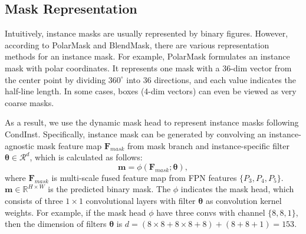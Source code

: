 \documentclass{article}
\begin{document}
\subsection{Mask Representation}

Intuitively, instance masks are usually represented by binary figures. However, according to PolarMask\cite{PolarMask} and BlendMask\cite{BlendMask}, there are various representation methods for an instance mask. For example, PolarMask formulates an instance mask with polar coordinates. It represents one mask with a 36-dim vector from the center point by dividing $360^{\circ}$ into 36 directions, and each value indicates the half-line length. In some cases, boxes (4-dim vectors) can even be viewed as very coarse masks. 

As a result, we use the dynamic mask head to represent instance masks following CondInst\cite{CondInst}. Specifically, instance mask can be generated by convolving an instance-agnostic mask feature map $\mathbf{{F}}_{mask}$ from mask branch and instance-specific filter $\bm{\theta} \in  \mathcal{R}^{d}$, which is calculated as follows:
\begin{equation}\label{maskhead}
    \mathbf{m} = \mathcal{\phi}(\mathbf{{F}}_{mask};\bm{\theta}),
\end{equation}
where $\mathbf{{F}}_{mask}$ is multi-scale fused feature map from FPN features $\{P_3, P_4, P_5\}$. $\mathbf{m} \in \mathbb{R}^{H\times W}$ is the predicted binary mask. The $\mathcal{\phi}$ indicates the mask head, which consists of three $1\times1$ convolutional layers with filter $\bm{\theta}$ as convolution kernel weights. For example, if the mask head $\mathcal{\phi}$ have three convs with channel $\{8,8,1\}$, then the dimension of filters $\bm{\theta}$ is $d = (8\times 8+8\times 8+8) +(8+8+1) = 153$.
\end{document}

